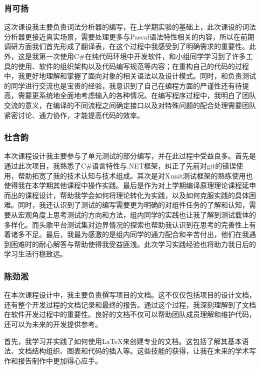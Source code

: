 \documentclass[../main.tex]{subfiles}
\begin{document}
\subsubsection{肖可扬}

这次课设我主要负责词法分析器的编写，在上学期实验的基础上，此次课设的词法分析器更接近真实场景，需要处理更多与Pascal语法特性相关的内容，所以在前期调研方面我们首先形成了翻译表，在这个过程中我感受到了明确需求的重要性。此外，这是我第一次使用C\#在纯代码环境中开发软件，和小组同学学习到了许多工具的使用、软件的组织架构以及代码编写规范等内容；在重构自己的代码的过程中，我更好地理解和掌握了面向对象的相关语法以及设计模式。同时，和负责测试的同学进行交流也是宝贵的经验，我意识到了自己在编程方面的严谨性还有待提高，需要更系统地全面地考虑输入的各种情况。在编写程序过程中，我明白了团队交流的意义，在编译的不同流程之间确定接口以及对特殊问题的配合处理需要团队紧密讨论、通力协作，才能提高代码的效率。

\subsubsection{杜含韵}

本次课程设计我主要参与了单元测试的部分编写，并在此过程中受益良多。首先是通过此次项目，我熟悉了C\#语言特性与.NET框架，纠正了先前对git的错误使用，帮助拓宽了我的技术认知与技术组成。其次是对Xunit测试框架的熟练使用也使得我在本学期其他课程中操作实践。最后是作为对上学期编译原理理论课程延申而出的课程设计，帮助我学会如何将理论转化为实践，以及如何克服实践的具体困难。同时，我还认识到了测试的编写需要更为明确的对组件任务的了解和认知，需要从宏观角度上思考测试的方向和方法，组内同学的实践也让我了解到测试载体的多样化。而头歌平台测试集对边界情况的探索也帮助我认识到在思考的完善性上有着诸多不足。最后，我最为感激的是组内同学的通力配合和辛苦付出，他们在我遇到困难时的耐心解答与帮助使得我受益匪浅。此次学习实践经验也将助力我日后的学习生活行稳致远。

\subsubsection{陈劲淞}

在本次课程设计中，我主要负责撰写项目的文档。这不仅仅包括项目的设计文档，还有整个开发过程的文档记录和最终的报告。通过这个过程，我深刻理解到了文档在软件开发过程中的重要性。良好的文档不仅可以帮助团队成员理解和维护代码，还可以为未来的开发提供参考。

首先，我学习并实践了如何使用\LaTeX 来创建专业的文档。这包括了解其基本语法、文档结构组织、图表和代码的插入等。这些技能的获得，让我在未来的学术写作和报告制作中更加得心应手。
\end{document}
